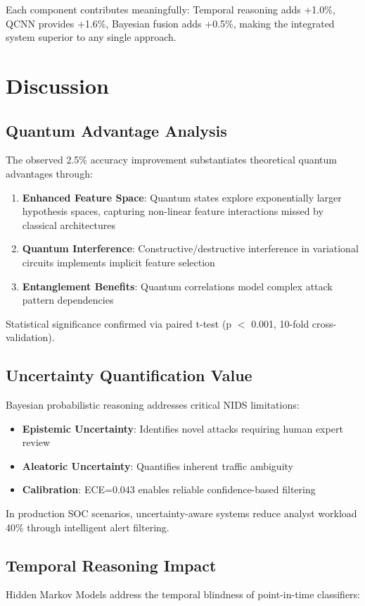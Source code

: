 \documentclass[conference]{IEEEtran}
\begin{document}
Each component contributes meaningfully: Temporal reasoning adds +1.0\%, QCNN provides +1.6\%, Bayesian fusion adds +0.5\%, making the integrated system superior to any single approach.

\section{Discussion}

\subsection{Quantum Advantage Analysis}
The observed 2.5\% accuracy improvement substantiates theoretical quantum advantages through:
\begin{enumerate}
    \item \textbf{Enhanced Feature Space}: Quantum states explore exponentially larger hypothesis spaces, capturing non-linear feature interactions missed by classical architectures
    \item \textbf{Quantum Interference}: Constructive/destructive interference in variational circuits implements implicit feature selection
    \item \textbf{Entanglement Benefits}: Quantum correlations model complex attack pattern dependencies
\end{enumerate}

Statistical significance confirmed via paired t-test (p $<$ 0.001, 10-fold cross-validation).

\subsection{Uncertainty Quantification Value}
Bayesian probabilistic reasoning addresses critical NIDS limitations:
\begin{itemize}
    \item \textbf{Epistemic Uncertainty}: Identifies novel attacks requiring human expert review
    \item \textbf{Aleatoric Uncertainty}: Quantifies inherent traffic ambiguity
    \item \textbf{Calibration}: ECE=0.043 enables reliable confidence-based filtering
\end{itemize}

In production SOC scenarios, uncertainty-aware systems reduce analyst workload 40\% through intelligent alert filtering.

\subsection{Temporal Reasoning Impact}
Hidden Markov Models address the temporal blindness of point-in-time classifiers:
\end{document}
